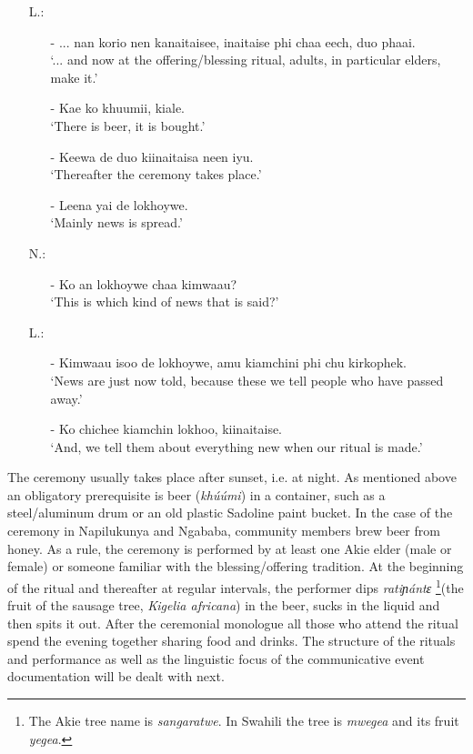 \documentclass[output=paper,colorlinks,citecolor=brown]{langscibook}
\begin{document}
\begin{enumerate}
    \item[L.:]
    \begin{enumerate}
        \item[-]    ... nan korio nen kanaitaisee, inaitaise phi chaa eech, duo phaai.\\
                    `... and now at the offering/blessing ritual, adults, in particular elders, make it.'
        \item[-]    Kae ko khuumii, kiale.\\
                    `There is beer, it is bought.'
        \item[-]    Keewa de duo kiinaitaisa neen iyu.\\
                    `Thereafter the ceremony takes place.'
        \item[-]    Leena yai de lokhoywe.\\
                    `Mainly news is spread.'
    \end{enumerate}
    \item[N.:]
    \begin{enumerate}
        \item[-]    Ko an lokhoywe chaa kimwaau?\\
                    `This is which kind of news that is said?' 
    \end{enumerate}
    \item[L.:]
    \begin{enumerate}
        \item[-]    Kimwaau isoo de lokhoywe, amu kiamchini phi chu kirkophek. \\
                    `News are just now told, because these we tell people who have passed away.'
        \item[-]    Ko chichee kiamchin lokhoo, kiinaitaise. \\
                    `And, we tell them about everything new when our ritual is made.'
    \end{enumerate}
\end{enumerate}

The ceremony usually takes place after sunset, i.e. at night. As mentioned above an obligatory prerequisite is beer (\textit{khúúmi}) in a container, such as a steel\slash aluminum drum or an old plastic Sadoline paint bucket. In the case of the ceremony in Napilukunya and Ngababa, community members brew beer from honey. As a rule, the ceremony is performed by at least one Akie elder (male or female) or someone familiar with the blessing/offering tradition. At the beginning of the ritual and thereafter at regular intervals, the performer dips \textit{ratiɲántɛ }\footnote{The Akie tree name is \textit{sangaratwe}. In Swahili the tree is \textit{mwegea} and its fruit \textit{yegea}.}(the fruit of the sausage tree, \textit{Kigelia africana}) in the beer, sucks in the liquid and then spits it out. After the ceremonial monologue all those who attend the ritual spend the evening together sharing food and drinks. The structure of the rituals and performance as well as the linguistic focus of the communicative event documentation  will be dealt with next.
\end{document}
